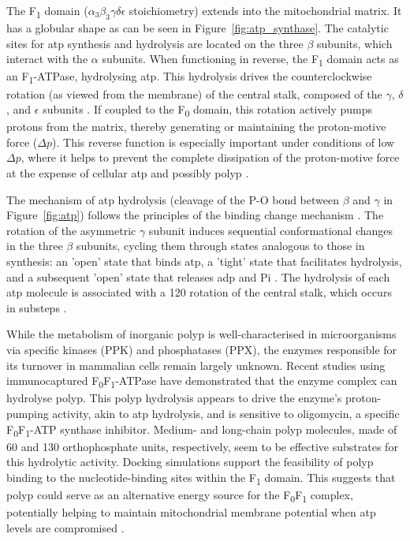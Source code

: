 The F\textsubscript{1} domain ($\alpha_3\beta_3\gamma\delta\epsilon$ stoichiometry) extends into the mitochondrial matrix. It has a globular shape as can be seen in Figure~\ref{fig:atp_synthase}. The catalytic sites for \ac{atp} synthesis and hydrolysis are located on the three $\beta$ subunits, which interact with the $\alpha$ subunits. When functioning in reverse, the F\textsubscript{1} domain acts as an F\textsubscript{1}-ATPase, hydrolysing \ac{atp}. This hydrolysis drives the counterclockwise rotation (as viewed from the membrane) of the central stalk, composed of the $\gamma$, $\delta$, and $\epsilon$ subunits \citep{walkerATPSynthesisRotary1998, walkerATPSynthaseUnderstood2013, boyerEnergyLifeATP1998}. If coupled to the F\textsubscript{0} domain, this rotation actively pumps protons from the matrix, thereby generating or maintaining the proton-motive force ($\Delta p$). This reverse function is especially important under conditions of low $\Delta p$, where it helps to prevent the complete dissipation of the proton-motive force at the expense of cellular \ac{atp} and possibly \ac{polyp} \citep{bonoraATPSynthesisStorage2012, walkerATPSynthaseUnderstood2013, baevInorganicPolyphosphateProduced2020}.

The mechanism of \ac{atp} hydrolysis (cleavage of the P-O bond between $\beta$ and $\gamma$ in Figure~\ref{fig:atp}) follows the principles of the binding change mechanism \citep{walkerATPSynthaseUnderstood2013}. The rotation of the asymmetric $\gamma$ subunit induces sequential conformational changes in the three $\beta$ subunits, cycling them through states analogous to those in synthesis: an 'open' state that binds \ac{atp}, a 'tight' state that facilitates hydrolysis, and a subsequent 'open' state that releases \ac{adp} and \ac{Pi} \citep{walkerATPSynthesisRotary1998, boyerEnergyLifeATP1998}. The hydrolysis of each \ac{atp} molecule is associated with a 120\textdegree{} rotation of the central stalk, which occurs in substeps \citep{walkerATPSynthaseUnderstood2013}.

While the metabolism of inorganic \ac{polyp} is well-characterised in microorganisms via specific kinases (PPK) and phosphatases (PPX), the enzymes responsible for its turnover in mammalian cells remain largely unknown. Recent studies using immunocaptured F\textsubscript{0}F\textsubscript{1}-ATPase have demonstrated that the enzyme complex can hydrolyse \ac{polyp}. This \ac{polyp} hydrolysis appears to drive the enzyme's proton-pumping activity, akin to \ac{atp} hydrolysis, and is sensitive to oligomycin, a specific F\textsubscript{0}F\textsubscript{1}-ATP synthase inhibitor. Medium- and long-chain \ac{polyp} molecules, made of 60 and 130 orthophosphate units, respectively, seem to be effective substrates for this hydrolytic activity. Docking simulations support the feasibility of \ac{polyp} binding to the nucleotide-binding sites within the F\textsubscript{1} domain. This suggests that \ac{polyp} could serve as an alternative energy source for the F\textsubscript{0}F\textsubscript{1} complex, potentially helping to maintain mitochondrial membrane potential when \ac{atp} levels are compromised \citep{baevInorganicPolyphosphateProduced2020, baevInorganicPolyphosphateF0F1ATP2022}.

